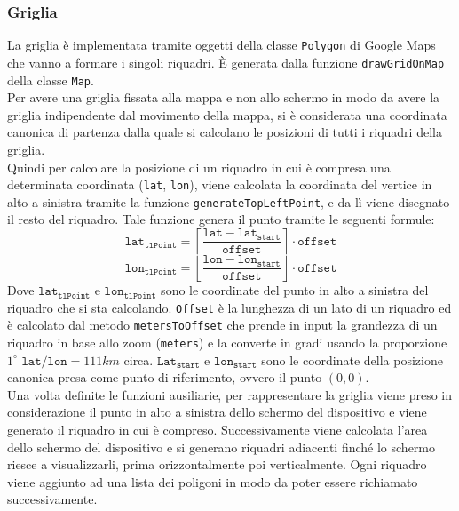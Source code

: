 \documentclass[11pt]{article}
\begin{document}
\subsubsection{Griglia}
La griglia è implementata tramite oggetti della classe \texttt{Polygon} di Google Maps che vanno a formare i singoli riquadri. È generata dalla funzione \texttt{drawGridOnMap} della classe \texttt{Map}.\\
Per avere una griglia fissata alla mappa e non allo schermo in modo da avere la griglia indipendente dal movimento della mappa, si è considerata una coordinata canonica di partenza dalla quale si calcolano le posizioni di tutti i riquadri della griglia. \\
Quindi per calcolare la posizione di un riquadro in cui è compresa una determinata coordinata (\texttt{lat}, \texttt{lon}), viene calcolata la coordinata del vertice in alto a sinistra tramite la funzione \texttt{generateTopLeftPoint}, e da lì viene disegnato il resto del riquadro. Tale funzione genera il punto tramite le seguenti formule:
\begin{equation*}
    \texttt{lat}_{\texttt{tlPoint}} = \left \lceil \dfrac{\texttt{lat} - \texttt{lat}_{\texttt{start}}}{\texttt{offset}} \right \rceil \cdot \texttt{offset}
\end{equation*}
\begin{equation*}
    \texttt{lon}_{\texttt{tlPoint}} = \left \lfloor \dfrac{\texttt{lon} - \texttt{lon}_{\texttt{start}}}{\texttt{offset}} \right \rfloor \cdot \texttt{offset}
\end{equation*}
Dove $\texttt{lat}_{\texttt{tlPoint}}$ e $\texttt{lon}_{\texttt{tlPoint}}$ sono le coordinate del punto in alto a sinistra del riquadro che si sta calcolando. \texttt{Offset} è la lunghezza di un lato di un riquadro ed è calcolato dal metodo \texttt{metersToOffset} che prende in input la grandezza di un riquadro in base allo zoom (\texttt{meters}) e la converte in gradi usando la proporzione $1^{\circ} \texttt{ lat}/\texttt{lon} = 111km$ circa. $\texttt{Lat}_{\texttt{start}}$ e $\texttt{lon}_{\texttt{start}}$ sono le coordinate della posizione canonica presa come punto di riferimento, ovvero il punto $(0,0)$. \\
Una volta definite le funzioni ausiliarie, per rappresentare la griglia viene preso in considerazione il punto in alto a sinistra dello schermo del dispositivo e viene generato il riquadro in cui è compreso. Successivamente viene calcolata l'area dello schermo del dispositivo e si generano riquadri adiacenti finché lo schermo riesce a visualizzarli, prima orizzontalmente poi verticalmente. Ogni riquadro viene aggiunto ad una lista dei poligoni in modo da poter essere richiamato successivamente.\\
\end{document}

